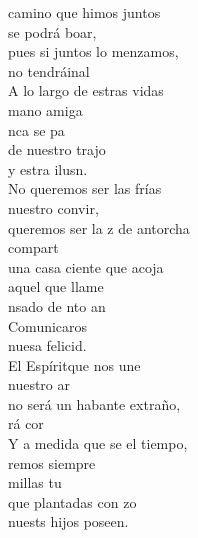 \documentclass[12pt]{article}
\begin{document}
\begin{multicols*}{2}
\begin{cancion}%
	 camino que himos juntos\\
	 se podrá boar,\\
	pues si juntos lo menzamos,\\
	 no tendráinal\\
	A lo largo de estras vidas\\
	 mano amiga\\
	nca se pa\\
	de nuestro trajo\\
	y estra ilusn. \\
	No queremos ser las frías\\
	 nuestro convir,\\
	queremos ser la z de antorcha\\
	 compart  \\
	una casa ciente que acoja\\
	aquel que llame\\
	nsado de nto an\\
	Comunicaros\\
	nuesa felicid.\\
	El Espíritque nos une\\
	 nuestro ar\\
	no será un habante extraño,\\
	rá cor\\
	Y a medida que se el tiempo,\\
	remos siempre\\
	millas  tu \\
	que plantadas con zo\\
	nuests hijos poseen. \\
\end{cancion}%


\end{multicols*}
\end{document}
